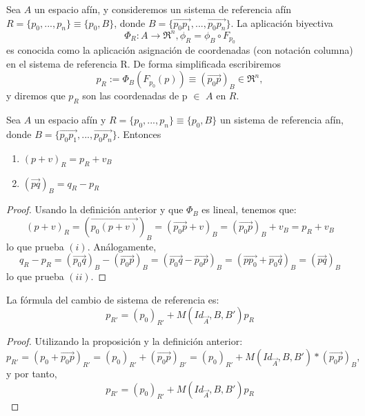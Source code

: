 \documentclass[a4paper,11pt, oneside]{book}
\begin{document}
\begin{def_asignacion}
	Sea $A$ un espacio afín, y consideremos un sistema de referencia afín $R = \{p_0,...,p_n\} \equiv \{p_0, B\}$, donde
	$B = \{\overrightarrow{p_0p_1},...,\overrightarrow{p_0p_n}\}$. La aplicación biyectiva
	\begin{equation}
	\Phi_R : A \rightarrow \Re^n, \phi_R = \phi_B \circ F_{p_0}
	\end{equation}
	es conocida como la aplicación asignación de coordenadas (con notación columna) en el sistema de referencia R. De forma simplificada escribiremos
	\begin{equation}
	p_R := \Phi_B(F_{p_0}(p)) \equiv (\overrightarrow{p_0p})_B \in \Re^n, 
	\end{equation}
	y diremos que $p_R$ son las coordenadas de p $\in$ $A$ en $R$.
\end{def_asignacion}
\begin{propiedades_afin}
	Sea $A$ un espacio afín y $R = \{p_0,...,p_n\} \equiv \{p_0,B\}$ un sistema de referencia afín, donde $B = \{\overrightarrow{p_0p_1},...,\overrightarrow{p_0p_n}\}$. Entonces
	\begin{enumerate}
		\item $(p+v)_R = p_R + v_B$
		\item $(\overrightarrow{pq})_B = q_R - p_R$
	\end{enumerate}
\end{propiedades_afin}
\begin{proof}
	Usando la definición anterior y que $\Phi_B$ es lineal, tenemos que:
	\begin{equation}
	(p+v)_R = (\overrightarrow{p_0(p+v)})_B = (\overrightarrow{p_0p}+v)_B = (\overrightarrow{p_0p})_B +v_B = p_R +v_B
	\end{equation}
	lo que prueba $(i)$. Análogamente,
	\begin{equation}
	q_R - p_R = (\overrightarrow{p_0q})_B - (\overrightarrow{p_0p})_B = (\overrightarrow{p_0q} - \overrightarrow{p_0p})_B = (\overrightarrow{pp_0}+\overrightarrow{p_0q})_B = (\overrightarrow{pq})_B
	\end{equation}
	lo que prueba $(ii)$.
\end{proof}
\begin{cambio_sist_ref}
		La fórmula del cambio de sistema de referencia es:
	\begin{equation}
		p_{R'} = (p_0)_{R'} + M(Id_{\overrightarrow{A}}, B, B')p_R
	\end{equation}
\end{cambio_sist_ref}
\begin{proof}
	Utilizando la proposición y la definición anterior:
	\begin{equation}
	p_{R'} = (p_0 + \overrightarrow{p_0p})_{R'} = (p_0)_{R'} + (\overrightarrow{p_{0}p})_{B'} = (p_0)_{R'} + M(Id_{\overrightarrow{A}}, B, B') * (\overrightarrow{p_0p})_B,
	\end{equation}
	y por tanto,
	\begin{equation}
	p_{R'} = (p_0)_{R'} + M(Id_{\overrightarrow{A}}, B, B')p_R
	\end{equation}
\end{proof}
\end{document}
